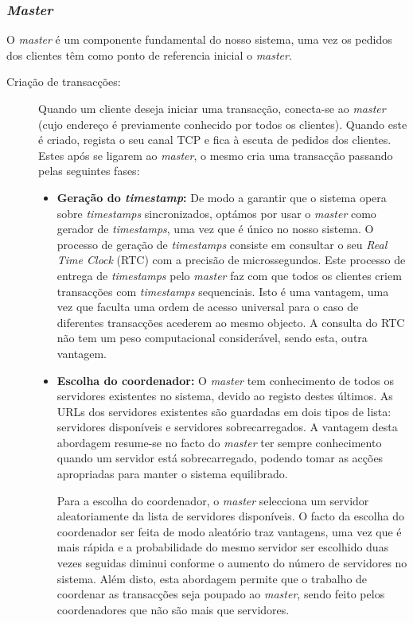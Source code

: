 \subsubsection{\textit{Master}}
O \textit{master} é um componente fundamental do nosso sistema, uma vez os pedidos dos clientes têm como ponto de referencia  inicial o \textit{master}.
\begin{description}

\item[Criação de transacções: ]
 Quando um cliente deseja iniciar uma transacção, conecta-se ao \textit{master} (cujo endereço é previamente conhecido por todos os clientes). Quando este é criado, regista o seu canal TCP e fica à escuta de pedidos dos clientes. Estes após se ligarem ao \textit{master}, o mesmo cria uma transacção passando pelas seguintes fases:
\begin{itemize}

\item \textbf{Geração do \textit{timestamp}:} De modo a  garantir que o sistema opera sobre \textit{timestamps} sincronizados, optámos por usar o \textit{master} como gerador de \textit{timestamps}, uma vez que é único no nosso sistema. O processo de geração de \textit{timestamps} consiste em consultar o seu \textit{Real Time Clock} (RTC) com a precisão de microssegundos. Este processo de entrega de \textit{timestamps} pelo \textit{master} faz com que todos os clientes criem transacções com \textit{timestamps} sequenciais. Isto é uma vantagem, uma vez que faculta uma ordem de acesso universal para o caso de diferentes transacções acederem ao mesmo objecto. A consulta do RTC não tem um peso computacional considerável, sendo esta, outra vantagem.

\item \textbf{Escolha do coordenador:} O \textit{master} tem conhecimento de todos os servidores existentes no sistema, devido ao registo destes últimos. As URLs dos servidores existentes são guardadas em dois tipos de lista: servidores disponíveis e servidores sobrecarregados. A vantagem desta abordagem resume-se no facto do \textit{master} ter  sempre conhecimento quando um servidor está sobrecarregado, podendo tomar as acções apropriadas para manter o sistema equilibrado.

Para a escolha do coordenador, o \textit{master} selecciona um servidor aleatoriamente da lista de servidores disponíveis. O facto da escolha do coordenador ser feita de modo aleatório traz vantagens, uma vez que é mais rápida e a probabilidade do mesmo servidor ser escolhido duas vezes seguidas diminui conforme o aumento do número de servidores no sistema. Além disto, esta abordagem permite que o trabalho de coordenar as transacções seja poupado ao \textit{master}, sendo feito pelos coordenadores que não são mais que servidores.


\end{itemize}
\end{description}
